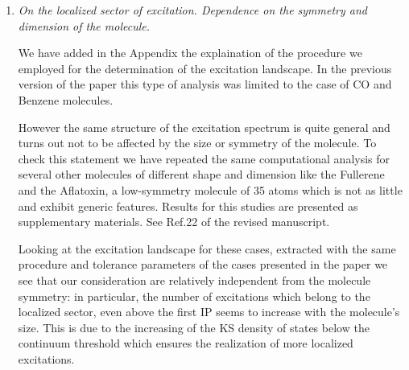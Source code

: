 \documentclass[11pt,a4paper]{article}
\begin{document}
\begin{enumerate}

 \item \emph{On the localized sector of excitation. Dependence on the symmetry and dimension of the molecule.}

 We have added in the Appendix the explaination
 of the procedure we employed for the determination of the excitation landscape.
  In the previous version of the paper this type of analysis was limited to the case of CO and Benzene molecules.

  However the same structure of the excitation spectrum is quite general and turns out not to be affected by the size or symmetry of the molecule. To check this statement we have repeated
 the same computational analysis for several other molecules of different shape and dimension like the Fullerene and the Aflatoxin, a low-symmetry molecule of 35 atoms which is not as little and exhibit generic features. Results for this studies
 are presented as supplementary materials. See Ref.22 of the revised manuscript.

 Looking at the excitation landscape for these cases, extracted with the same procedure and tolerance parameters of the cases presented in the paper we see that our consideration are relatively independent from the molecule symmetry: in particular, the number of excitations which
 belong to the localized sector, even above the first IP
 seems to increase with the molecule's size.
 This is due to the increasing of the KS density of states below the continuum threshold which ensures the realization of more localized excitations.


\end{enumerate}
\end{document}
